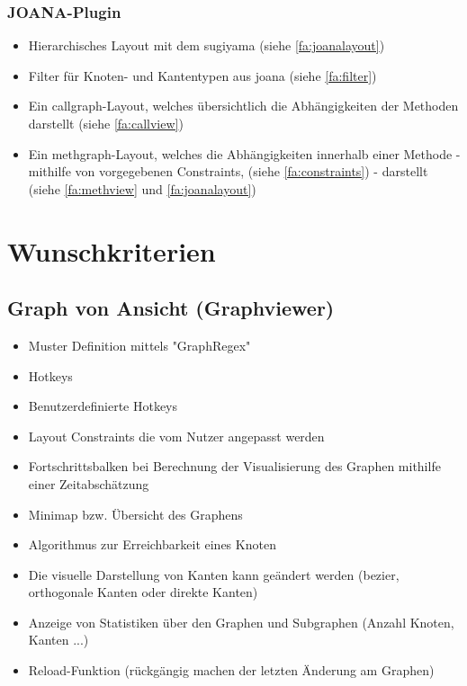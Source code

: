   \subsubsection{JOANA-Plugin}
    \begin{itemize}
      \item Hierarchisches Layout mit dem \gls{sugiyama} (siehe \ref{fa:joanalayout})
      \item Filter für Knoten- und Kantentypen aus \gls{joana} (siehe \ref{fa:filter})
      \item Ein \gls{callgraph}-Layout, welches übersichtlich die Abhängigkeiten der Methoden darstellt (siehe \ref{fa:callview})
      \item Ein \gls{methgraph}-Layout, welches die Abhängigkeiten innerhalb einer Methode - mithilfe von vorgegebenen Constraints, (siehe \ref{fa:constraints}) - darstellt (siehe \ref{fa:methview} und \ref{fa:joanalayout})
    \end{itemize}
  

\section{Wunschkriterien}

\subsection{Graph von Ansicht (Graphviewer)}
  \begin{itemize}
    \item Muster Definition mittels "GraphRegex"
    \item Hotkeys
    \item Benutzerdefinierte Hotkeys
    \item Layout Constraints die vom Nutzer angepasst werden
    \item Fortschrittsbalken bei Berechnung der Visualisierung des Graphen mithilfe einer Zeitabschätzung
    \item Minimap bzw. Übersicht des Graphens
    \item Algorithmus zur Erreichbarkeit eines Knoten
    \item Die visuelle Darstellung von Kanten kann geändert werden (\gls{bezier}, orthogonale Kanten oder direkte Kanten)
    \item Anzeige von Statistiken über den Graphen und \gls{Subgraph}en (Anzahl Knoten, Kanten ...)
    \item Reload-Funktion (rückgängig machen der letzten Änderung am Graphen)
  \end{itemize}

